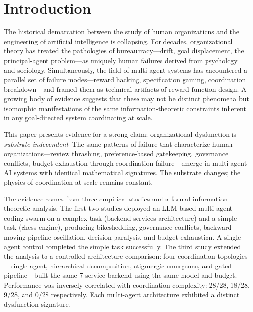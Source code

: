\documentclass[11pt,a4paper]{article}
\begin{document}
\section{Introduction}
\label{sec:intro}

The historical demarcation between the study of human organizations and the engineering of artificial intelligence is collapsing. For decades, organizational theory has treated the pathologies of bureaucracy---drift, goal displacement, the principal-agent problem---as uniquely human failures derived from psychology and sociology. Simultaneously, the field of multi-agent systems has encountered a parallel set of failure modes---reward hacking, specification gaming, coordination breakdown---and framed them as technical artifacts of reward function design. A growing body of evidence suggests that these may not be distinct phenomena but isomorphic manifestations of the same information-theoretic constraints inherent in any goal-directed system coordinating at scale.

This paper presents evidence for a strong claim: organizational dysfunction is \emph{substrate-independent}. The same patterns of failure that characterize human organizations---review thrashing, preference-based gatekeeping, governance conflicts, budget exhaustion through coordination failure---emerge in multi-agent AI systems with identical mathematical signatures. The substrate changes; the physics of coordination at scale remains constant.

The evidence comes from three empirical studies and a formal information-theoretic analysis. The first two studies deployed an LLM-based multi-agent coding swarm on a complex task (backend services architecture) and a simple task (chess engine), producing bikeshedding, governance conflicts, backward-moving pipeline oscillation, decision paralysis, and budget exhaustion. A single-agent control completed the simple task successfully. The third study extended the analysis to a controlled architecture comparison: four coordination topologies---single agent, hierarchical decomposition, stigmergic emergence, and gated pipeline---built the same 7-service backend using the same model and budget. Performance was inversely correlated with coordination complexity: 28/28, 18/28, 9/28, and 0/28 respectively. Each multi-agent architecture exhibited a distinct dysfunction signature.
\end{document}
